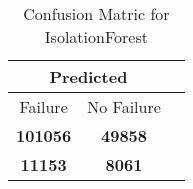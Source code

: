 \begin{table}[] 
\caption{Confusion Matric for IsolationForest} 
\label{Table: Prediction Accuracy-NoneIsolationForest90.0EKF-ignoreReflection-Reflection} 
\centering 
\begin{tabular} 
 {@{}ccc@{}} 
\toprule 
\multicolumn{2}{c}{\textbf{Predicted}}
 \\ \midrule 
\multicolumn{1}{|c|}{Failure} & 
\multicolumn{1}{c|}{No Failure}
 \\ \midrule 
\multicolumn{1}{|c|}{\color{green}\textbf{101056}} & 
\multicolumn{1}{c|}{\color{green}\textbf{49858}}
 \\ \midrule 
\multicolumn{1}{|c|}{\color{red}\textbf{11153}} & 
\multicolumn{1}{c|}{\color{red}\textbf{8061}}
 \\ \bottomrule 
\end{tabular} 
\end{table} 
